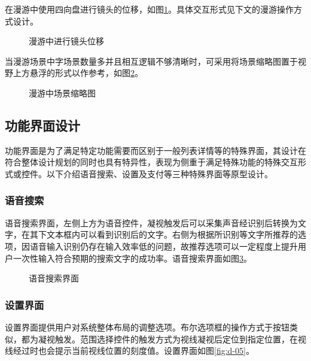 在漫游中使用四向盘进行镜头的位移，如图\ref{fig:d-10}。具体交互形式见下文的漫游操作方式设计。

\begin{figure}[htp]
\centering
{}
\caption{漫游中进行镜头位移}
\label{fig:d-10}
\end{figure}

当漫游场景中字场景数量多并且相互逻辑不够清晰时，可采用将场景缩略图置于视野上方悬浮的形式以作参考，如图\ref{fig:d-11}。

\begin{figure}[htp]
\centering
{}
\caption{漫游中场景缩略图}
\label{fig:d-11}
\end{figure}

\subsection{功能界面设计}

功能界面是为了满足特定功能需要而区别于一般列表详情等的特殊界面，其设计在符合整体设计规划的同时也具有特异性，表现为侧重于满足特殊功能的特殊交互形式或控件。以下介绍语音搜索、设置及支付等三种特殊界面等原型设计。

\subsubsection{语音搜索}
语音搜索界面，左侧上方为语音控件，凝视触发后可以采集声音经识别后转换为文字，在其下文本框内可以看到识别后的文字。右侧为根据所识别等文字所推荐的选项，因语音输入识别仍存在输入效率低的问题，故推荐选项可以一定程度上提升用户一次性输入符合预期的搜索文字的成功率。语音搜索界面如图\ref{fig:d-04}。

\begin{figure}[htp]
\centering
{}
\caption{语音搜索界面}
\label{fig:d-04}
\end{figure}

\subsubsection{设置界面}
设置界面提供用户对系统整体布局的调整选项。布尔选项框的操作方式于按钮类似，都为凝视触发。范围选择控件的触发方式为视线凝视后定位到指定位置，在视线经过时也会提示当前视线位置的刻度值。设置界面如图\ref{fig:d-05}。

